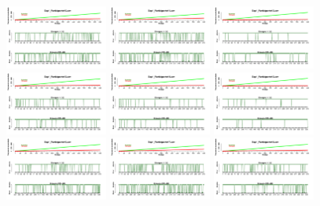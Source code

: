 \documentclass[a4paper ]{article}
\begin{document}
\begin{figure}[th]
\includegraphics[width=0.3\textwidth]{Figures/Success_Exp1_P10} \includegraphics[width=0.3\textwidth]{Figures/Success_Exp1_P11} \includegraphics[width=0.3\textwidth]{Figures/Success_Exp1_P12}
\includegraphics[width=0.3\textwidth]{Figures/Success_Exp1_P13} \includegraphics[width=0.3\textwidth]{Figures/Success_Exp1_P14} \includegraphics[width=0.3\textwidth]{Figures/Success_Exp1_P15}
\includegraphics[width=0.3\textwidth]{Figures/Success_Exp1_P16} \includegraphics[width=0.3\textwidth]{Figures/Success_Exp1_P17} \includegraphics[width=0.3\textwidth]{Figures/Success_Exp1_P18}

\end{figure}
\end{document}

